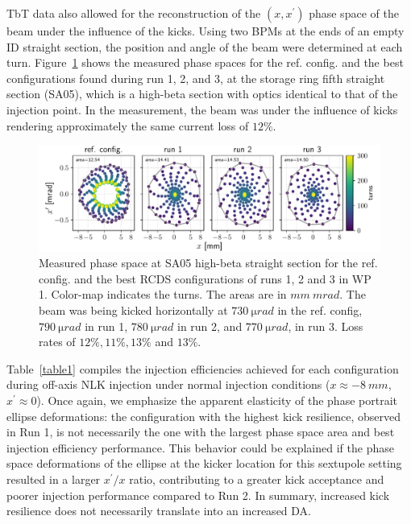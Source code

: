 TbT data also allowed for the reconstruction of the $(x,x^\prime)$ phase space of the beam under the influence of the kicks. Using two BPMs at the ends of an empty ID straight section, the position and angle of the beam were determined at each turn. Figure~\ref{fig:oldtunes_phase} shows the measured phase spaces for the ref. config. and the best configurations found during run 1, 2, and 3, at the storage ring fifth straight section (SA05), which is a high-beta section with optics identical to that of the injection point. In the measurement, the beam was under the influence of kicks rendering approximately the same current loss of $12\%$.
\begin{figure}[tb]
    \centering
        \includegraphics[width=\textwidth]{Images/WEPL087_f2.pdf}
        \caption[Measured phase space at SA05 high-beta straight section for the ref. config. and the best RCDS configurations of runs 1, 2 and 3 in WP 1.]{Measured phase space at SA05 high-beta straight section for the ref. config. and the best RCDS configurations of runs 1, 2 and 3 in WP 1. Color-map indicates the turns. The areas are in $\unit{mm}~\unit{mrad}$. The beam was being kicked horizontally at $730~\unit{\micro rad}$ in the ref. config, $790~\unit{\micro rad}$ in run 1, $780~\unit{\micro rad}$ in run 2, and $770~\unit{\micro rad}$, in run 3. Loss rates of  $12\%, 11\%, 13\%$ and $13\%$.}
        \label{fig:oldtunes_phase}
\end{figure}

Table~\ref{table1} compiles the injection efficiencies achieved for each configuration during off-axis NLK injection under normal injection conditions ($x\approx -8~\unit{mm}$, $x^\prime\approx 0 $).
Once again, we emphasize the apparent elasticity of the phase portrait ellipse deformations: the configuration with the highest kick resilience, observed in Run 1, is not necessarily the one with the largest phase space area and best injection efficiency performance. This behavior could be explained if the phase space deformations of the ellipse at the kicker location for this sextupole setting resulted in a larger $x^\prime/x$ ratio, contributing to a greater kick acceptance and poorer injection performance compared to Run 2. In summary, increased kick resilience does not necessarily translate into an increased DA.

